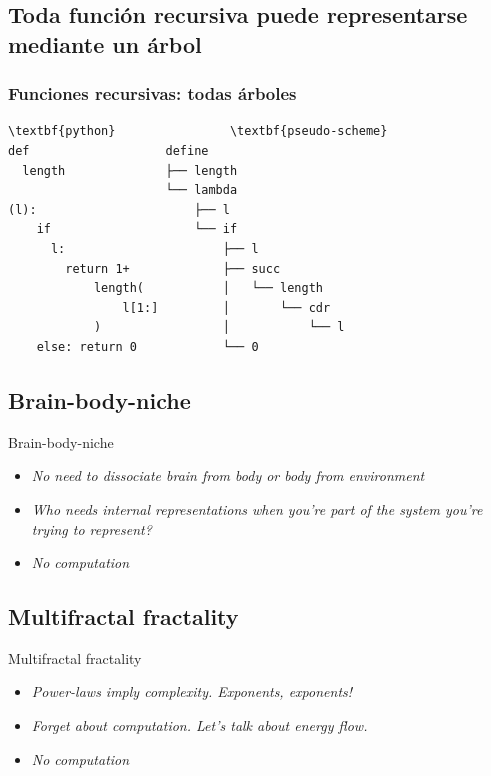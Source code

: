 \documentclass[xcolor=x11names,compress]{beamer}
\renewcommand{\(}{\begin{columns}}
\renewcommand{\)}{\end{columns}}
\newcommand{\<}[1]{\begin{column}{#1}}
\renewcommand{\>}{\end{column}}
\begin{document}
\subsection{Toda función recursiva puede representarse mediante un árbol}
\begin{frame}[fragile]
    \frametitle{Funciones recursivas: todas árboles}
    \codeLengthRecursionSmall
\begin{Verbatim}[commandchars=\\\{\},codes={\catcode`$=3\catcode`_=8}]
\textbf{python}                \textbf{pseudo-scheme}
def                   define                    
  length              ├── length                
                      └── lambda                
(l):                      ├── l                 
    if                    └── if                
      l:                      ├── l             
        return 1+             ├── succ          
            length(           │   └── length    
                l[1:]         │       └── cdr   
            )                 │           └── l 
    else: return 0            └── 0             
\end{Verbatim}

\end{frame}

\subsection{Brain-body-niche}
\begin{frame}{Brain-body-niche}

\begin{itemize}
    \item \emph{No need to dissociate brain from body or body from environment}
    \item \emph{Who needs internal representations when you're part of the system you're trying to represent?}
    \item \emph{No computation}
\end{itemize}
\end{frame}

\subsection{Multifractal fractality}
\begin{frame}{Multifractal fractality}
\begin{itemize}
    \item \emph{Power-laws imply complexity. Exponents, exponents!}
    \item \emph{Forget about computation. Let's talk about energy flow.}
    \item \emph{No computation}
\end{itemize}

\end{frame}
\end{document}
